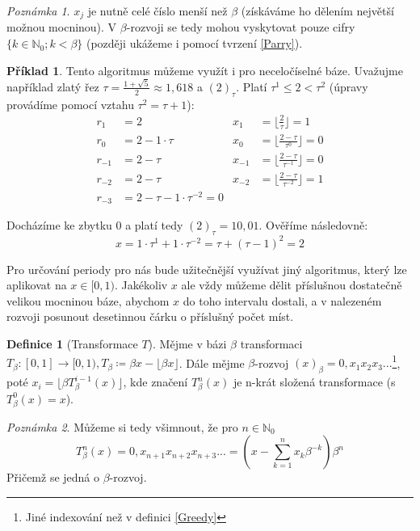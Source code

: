 \documentclass{article}
\theoremstyle{definition}
\newtheorem{example}{Příklad}
\theoremstyle{definition}
\newtheorem{definice}{Definice}[section]
\theoremstyle{remark}
\newtheorem*{pozn}{Poznámka}
\numberwithin{equation}{section}
\begin{document}
\begin{pozn}
	$x_j$ je nutně celé číslo menší než $\beta$ (získáváme ho dělením největší možnou mocninou). V $\beta$-rozvoji se tedy mohou vyskytovat pouze cifry $\{k \in \mathbb{N}_0; k < \beta\}$ (později ukážeme i pomocí tvrzení \ref{Parry}).
\end{pozn}

\begin{example}
	Tento algoritmus můžeme využít i pro neceločíselné báze. Uvažujme například zlatý řez $\tau = \frac{1 + \sqrt{5}}{2} \approx 1,618$ a $(2)_\tau$. Platí $\tau^1 \leq 2 < \tau^2$ (úpravy provádíme pomocí vztahu $\tau^2 = \tau + 1$):
	\begin{align*}
		r_1    & = 2                                & x_1    & = \lfloor \frac{2}{\tau} \rfloor = 1             \\
		r_0    & = 2 - 1 \cdot \tau                 & x_0    & = \lfloor \frac{2 - \tau}{\tau^0} \rfloor = 0    \\
		r_{-1} & = 2 - \tau                         & x_{-1} & = \lfloor \frac{2 - \tau}{\tau^{-1}} \rfloor = 0 \\
		r_{-2} & = 2 - \tau                         & x_{-2} & = \lfloor \frac{2 - \tau}{\tau^{-2}} \rfloor = 1 \\
		r_{-3} & = 2 - \tau - 1 \cdot \tau^{-2} = 0
	\end{align*}

	Docházíme ke zbytku 0 a platí tedy $(2)_\tau = 10,01$. Ověříme následovně:
	\[
		x = 1 \cdot \tau^1 + 1 \cdot \tau^{-2} = \tau + (\tau - 1)^2 = 2
	\]
\end{example}

Pro určování periody pro nás bude užitečnější využívat jiný algoritmus, který lze aplikovat na $x \in [0, 1)$. Jakékoliv $x$ ale vždy můžeme dělit příslušnou dostatečně velikou mocninou báze, abychom $x$ do toho intervalu dostali, a v nalezeném rozvoji posunout desetinnou čárku o příslušný počet míst.

\begin{definice}[Transformace $T$]
	Mějme v bázi $\beta$ transformaci $T_\beta : [0, 1] \to [0, 1), T_\beta \coloneq \beta x - \lfloor \beta x \rfloor$. Dále mějme $\beta$-rozvoj $(x)_\beta = 0,x_1x_2x_3...$\footnote{Jiné indexování než v definici \ref{Greedy}}, poté $x_i = \lfloor \beta T_\beta^{i - 1}(x)\rfloor$, kde značení $T_\beta^n(x)$ je n-krát složená transformace (s $T_\beta^0(x) = x$).
\end{definice}

\begin{pozn}
	Můžeme si tedy všimnout, že pro $n \in \mathbb{N}_0$
	\[
		T_\beta^n(x) = 0,x_{n + 1}x_{n + 2}x_{n + 3}... = (x - \sum_{k = 1}^nx_k\beta^{-k})\beta^n
	\]
	Přičemž se jedná o $\beta$-rozvoj.
\end{pozn}
\end{document}
